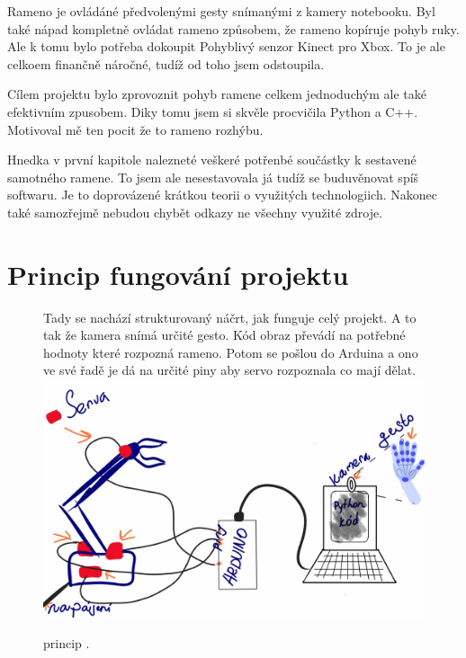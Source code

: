 \documentclass[12pt, a4paper,
twoside,        %
openright
]{report}
\begin{document}
{Rameno je ovládáné předvolenými gesty snímanými z kamery notebooku. Byl také nápad kompletně ovládat rameno způsobem, že rameno kopíruje pohyb ruky. Ale k tomu bylo potřeba dokoupit Pohyblivý senzor Kinect pro Xbox. To je ale celkoem finančně náročné, tudíž od toho jsem odstoupila.	

Cílem projektu bylo zprovoznit pohyb ramene celkem jednoduchým ale také efektivním zpusobem. Diky tomu jsem si skvěle procvičila Python a C++. Motivoval mě ten pocit že to rameno rozhýbu. 

Hnedka v první kapitole nalezneté  veškeré potřenbé součástky k sestavené samotného ramene. To jsem ale nesestavovala já tudíž se buduvěnovat spíš softwaru. Je to doprovázené krátkou teorii o využitých technologiich. Nakonec také samozřejmě nebudou chybět odkazy ne všechny využité zdroje. 


\chapter{Princip fungování projektu}
\begin{figure}[h]
	Tady se nachází strukturovaný náčrt, jak funguje celý projekt.
	A to tak že kamera snímá určité gesto. Kód obraz převádí na potřebné hodnoty které rozpozná rameno. Potom se pošlou do Arduina	a ono ve své řadě je dá na určité piny aby servo rozpoznala co mají dělat.
	\centering
	\includegraphics[width=0.9\linewidth]{image/princip.jpg} 
	
	
	\caption{princip \cite{princip}.} %
	\label{fig:princip} %
\end{figure}


}
\end{document}
